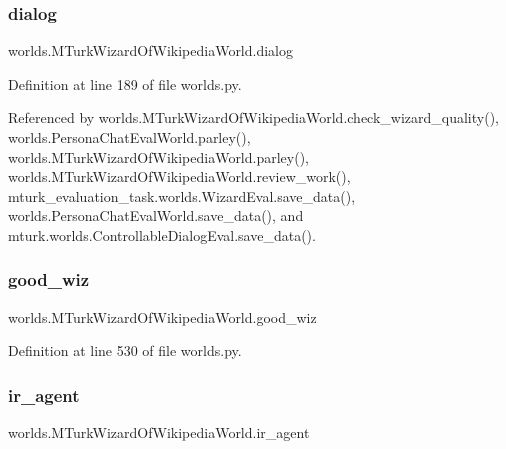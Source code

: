 \subsubsection{\texorpdfstring{dialog}{dialog}}
{\footnotesize\ttfamily worlds.\+M\+Turk\+Wizard\+Of\+Wikipedia\+World.\+dialog}



Definition at line 189 of file worlds.\+py.



Referenced by worlds.\+M\+Turk\+Wizard\+Of\+Wikipedia\+World.\+check\+\_\+wizard\+\_\+quality(), worlds.\+Persona\+Chat\+Eval\+World.\+parley(), worlds.\+M\+Turk\+Wizard\+Of\+Wikipedia\+World.\+parley(), worlds.\+M\+Turk\+Wizard\+Of\+Wikipedia\+World.\+review\+\_\+work(), mturk\+\_\+evaluation\+\_\+task.\+worlds.\+Wizard\+Eval.\+save\+\_\+data(), worlds.\+Persona\+Chat\+Eval\+World.\+save\+\_\+data(), and mturk.\+worlds.\+Controllable\+Dialog\+Eval.\+save\+\_\+data().

\mbox{\label{classworlds_1_1MTurkWizardOfWikipediaWorld_a2c8a7347284827e281dccd9265c7eb3f}} 
\subsubsection{\texorpdfstring{good\+\_\+wiz}{good\_wiz}}
{\footnotesize\ttfamily worlds.\+M\+Turk\+Wizard\+Of\+Wikipedia\+World.\+good\+\_\+wiz}



Definition at line 530 of file worlds.\+py.

\mbox{\label{classworlds_1_1MTurkWizardOfWikipediaWorld_ade9f0ec53fc216d66d1028ddef048454}} 
\subsubsection{\texorpdfstring{ir\+\_\+agent}{ir\_agent}}
{\footnotesize\ttfamily worlds.\+M\+Turk\+Wizard\+Of\+Wikipedia\+World.\+ir\+\_\+agent}



